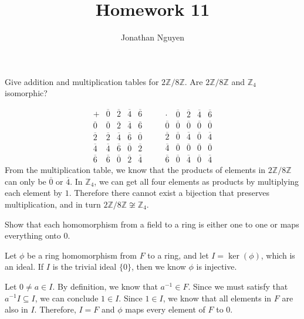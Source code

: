 \documentclass[11pt]{article}
\title{Homework 11}
\author{Jonathan Nguyen}
\begin{document}
\begin{problem}[26.4]
    Give addition and multiplication tables for $2\mathbb{Z}/8\mathbb{Z}$. Are $2\mathbb{Z}/8\mathbb{Z}$ and $\mathbb{Z}_4$ isomorphic?
\end{problem}
\begin{solution}
    \[
\begin{array}{c|cccc}
+ & \overline{0} & \overline{2} & \overline{4} & \overline{6} \\
\hline
\overline{0} & \overline{0} & \overline{2} & \overline{4} & \overline{6} \\
\overline{2} & \overline{2} & \overline{4} & \overline{6} & \overline{0} \\
\overline{4} & \overline{4} & \overline{6} & \overline{0} & \overline{2} \\
\overline{6} & \overline{6} & \overline{0} & \overline{2} & \overline{4}
\end{array}
\qquad
\begin{array}{c|cccc}
\cdot & \overline{0} & \overline{2} & \overline{4} & \overline{6} \\
\hline
\overline{0} & \overline{0} & \overline{0} & \overline{0} & \overline{0} \\
\overline{2} & \overline{0} & \overline{4} & \overline{0} & \overline{4} \\
\overline{4} & \overline{0} & \overline{0} & \overline{0} & \overline{0} \\
\overline{6} & \overline{0} & \overline{4} & \overline{0} & \overline{4}
\end{array}
\]
    From the multiplication table, we know that the products of elements in
    $2\mathbb{Z}/8\mathbb{Z}$ can only be $\overline{0}$ or $\overline{4}$.
    In $\mathbb{Z}_4$, we can get all four elements as products by
    multiplying each element by $1$. Therefore there cannot exist a
    bijection that preserves multiplication, and in turn
$2\mathbb{Z}/8\mathbb{Z} \not\cong \mathbb{Z}_4$.
\end{solution}
\begin{problem}[26.18]
    Show that each homomorphism from a field to a ring is either one to one or maps everything onto 0.
\end{problem}
\begin{solution}
    Let $\phi$ be a ring homomorphism from $F$ to a ring, and let
    $I = \ker(\phi)$, which is an ideal. If $I$ is the trivial ideal
    $\{0\}$, then we know $\phi$ is injective.

    Let $0 \neq a \in I$. By definition, we know that $a^{-1} \in F$.
    Since we must satisfy that $a^{-1}I \subseteq I$, we can conclude
    $1 \in I$. Since $1 \in I$, we know that all elements in $F$ are
    also in $I$. Therefore, $I = F$ and $\phi$ maps every element of
    $F$ to $0$.
\end{solution}
\end{document}
